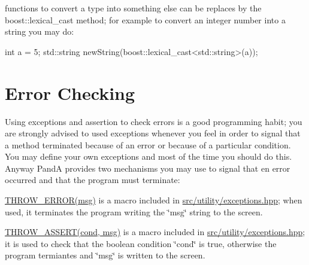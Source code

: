 \begin{DoxyItemize}
\item functions to convert a type into something else can be replaces by the boost\+::lexical\+\_\+cast method; for example to convert an integer number into a string you may do\+: \begin{DoxyVerb}int a = 5;
std::string newString(boost::lexical_cast<std::string>(a));
\end{DoxyVerb}

\end{DoxyItemize}\hypertarget{programming_style_check_errors}{}\section{Error Checking}\label{programming_style_check_errors}
Using exceptions and assertion to check errors is a good programming habit; you are strongly advised to used exceptions whenever you feel in order to signal that a method terminated because of an error or because of a particular condition. You may define your own exceptions and most of the time you should do this. Anyway PandA provides two mechanisms you may use to signal that en error occurred and that the program must terminate\+:
\begin{DoxyEnumerate}
\item {\ttfamily \hyperlink{exceptions_8hpp_ab529baaeae1796fcefb26624f95fb5e0}{T\+H\+R\+O\+W\+\_\+\+E\+R\+R\+O\+R(msg)}} is a macro included in \hyperlink{exceptions_8hpp}{src/utility/exceptions.\+hpp}; when used, it terminates the program writing the \char`\"{}msg\char`\"{} string to the screen.
\item {\ttfamily \hyperlink{exceptions_8hpp_a6b69ed2bbf57b0c84148bced41c772e6}{T\+H\+R\+O\+W\+\_\+\+A\+S\+S\+E\+R\+T(cond, msg)}} is a macro included in \hyperlink{exceptions_8hpp}{src/utility/exceptions.\+hpp}; it is used to check that the boolean condition \char`\"{}cond\char`\"{} is true, otherwise the program termiantes and \char`\"{}msg\char`\"{} is written to the screen.
\end{DoxyEnumerate}

